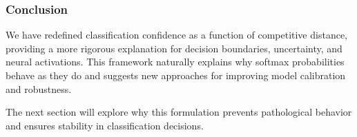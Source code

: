 \subsubsection{Conclusion}

We have redefined classification confidence as a function of competitive distance, providing a more rigorous explanation for decision boundaries, uncertainty, and neural activations. This framework naturally explains why softmax probabilities behave as they do and suggests new approaches for improving model calibration and robustness.

The next section will explore why this formulation prevents pathological behavior and ensures stability in classification decisions.

